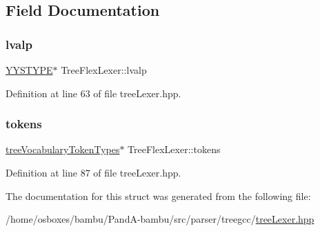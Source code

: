 \subsection{Field Documentation}
\mbox{\label{structTreeFlexLexer_ac91928069e90985339397a2c2f3f63a9}} 
\subsubsection{\texorpdfstring{lvalp}{lvalp}}
{\footnotesize\ttfamily \hyperlink{asn__parser_8cpp_a2ceb5b985e149f18e018b142cfdd7264}{Y\+Y\+S\+T\+Y\+PE}$\ast$ Tree\+Flex\+Lexer\+::lvalp}



Definition at line 63 of file tree\+Lexer.\+hpp.

\mbox{\label{structTreeFlexLexer_a89c980bec1bdd735a1ec392084dac4d6}} 
\subsubsection{\texorpdfstring{tokens}{tokens}}
{\footnotesize\ttfamily \hyperlink{structtreeVocabularyTokenTypes}{tree\+Vocabulary\+Token\+Types}$\ast$ Tree\+Flex\+Lexer\+::tokens}



Definition at line 87 of file tree\+Lexer.\+hpp.



The documentation for this struct was generated from the following file\+:\begin{DoxyCompactItemize}
\item 
/home/osboxes/bambu/\+Pand\+A-\/bambu/src/parser/treegcc/\hyperlink{treeLexer_8hpp}{tree\+Lexer.\+hpp}\end{DoxyCompactItemize}
